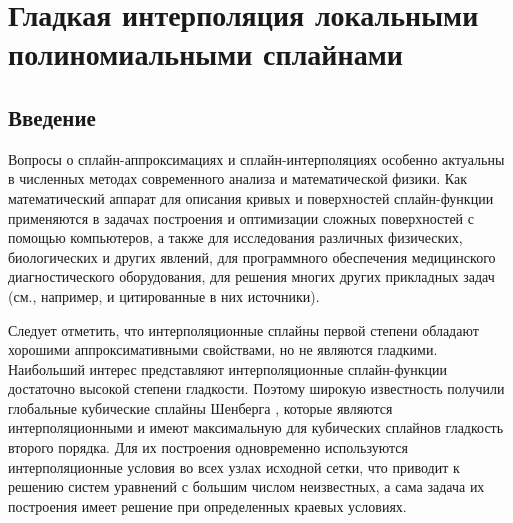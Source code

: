 \chapter{Гладкая интерполяция локальными полиномиальными сплайнами}
%
%
%
%
%
%

\section{Введение}

Вопросы о сплайн-аппроксимациях и сплайн-интерполяциях особенно актуальны
в численных методах современного анализа и математической физики.
Как математический аппарат для описания кривых и поверхностей сплайн-функции
применяются в задачах построения и оптимизации сложных поверхностей с помощью
компьютеров, а также для исследования различных физических, биологических и
других явлений,  для программного обеспечения медицинского диагностического
оборудования, для решения многих других прикладных задач
(см., например,\cite{ark-4,ark-5,ark-6,ark-7} и цитированные в них источники).

Следует отметить, что интерполяционные сплайны первой степени обладают
хорошими аппроксимативными свойствами, но не являются гладкими. Наибольший
интерес представляют интерполяционные сплайн-функции достаточно высокой
степени гладкости. Поэтому широкую известность получили глобальные
кубические сплайны Шенберга \cite{ark-4}, которые являются интерполяционными и
имеют максимальную для кубических сплайнов гладкость второго порядка.
Для их построения одновременно используются интерполяционные условия
во всех узлах исходной сетки, что приводит к решению систем уравнений
с большим числом неизвестных, а сама задача их построения имеет решение
при определенных краевых условиях.

